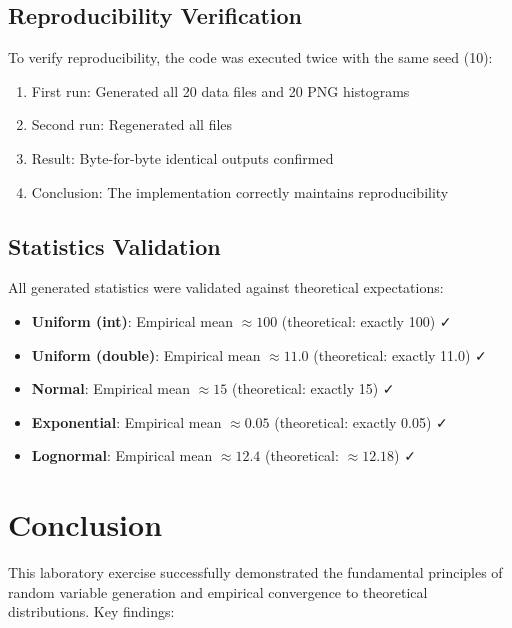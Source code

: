 \documentclass[12pt]{article}
\begin{document}
\subsection{Reproducibility Verification}

To verify reproducibility, the code was executed twice with the same seed (10):
\begin{enumerate}
    \item First run: Generated all 20 data files and 20 PNG histograms
    \item Second run: Regenerated all files
    \item Result: Byte-for-byte identical outputs confirmed
    \item Conclusion: The implementation correctly maintains reproducibility
\end{enumerate}

\subsection{Statistics Validation}

All generated statistics were validated against theoretical expectations:
\begin{itemize}
    \item \textbf{Uniform (int)}: Empirical mean $\approx 100$ (theoretical: exactly 100) ✓
    \item \textbf{Uniform (double)}: Empirical mean $\approx 11.0$ (theoretical: exactly 11.0) ✓
    \item \textbf{Normal}: Empirical mean $\approx 15$ (theoretical: exactly 15) ✓
    \item \textbf{Exponential}: Empirical mean $\approx 0.05$ (theoretical: exactly 0.05) ✓
    \item \textbf{Lognormal}: Empirical mean $\approx 12.4$ (theoretical: $\approx 12.18$) ✓
\end{itemize}

\section{Conclusion}

This laboratory exercise successfully demonstrated the fundamental principles of random variable generation and empirical convergence to theoretical distributions. Key findings:
\end{document}
